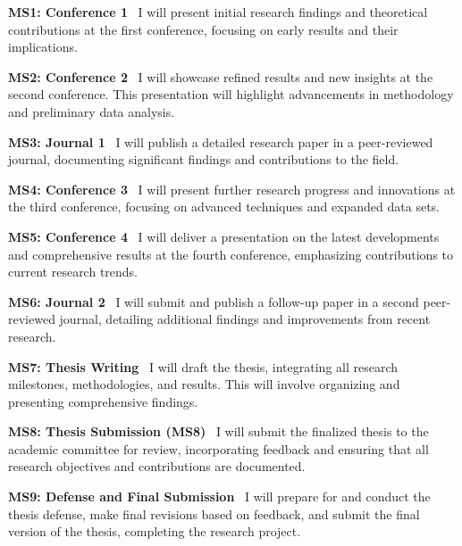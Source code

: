 \noindent \textbf{MS1: Conference 1} \
I will present initial research findings and theoretical contributions at the first conference, focusing on early results and their implications.

\noindent \textbf{MS2: Conference 2} \
I will showcase refined results and new insights at the second conference. This presentation will highlight advancements in methodology and preliminary data analysis.

\noindent \textbf{MS3: Journal 1} \
I will publish a detailed research paper in a peer-reviewed journal, documenting significant findings and contributions to the field.

\noindent \textbf{MS4: Conference 3} \
I will present further research progress and innovations at the third conference, focusing on advanced techniques and expanded data sets.

\noindent \textbf{MS5: Conference 4} \
I will deliver a presentation on the latest developments and comprehensive results at the fourth conference, emphasizing contributions to current research trends.

\noindent \textbf{MS6: Journal 2 } \
I will submit and publish a follow-up paper in a second peer-reviewed journal, detailing additional findings and improvements from recent research.

\noindent \textbf{MS7: Thesis Writing } \
I will draft the thesis, integrating all research milestones, methodologies, and results. This will involve organizing and presenting comprehensive findings.

\noindent \textbf{MS8: Thesis Submission (MS8)} \
I will submit the finalized thesis to the academic committee for review, incorporating feedback and ensuring that all research objectives and contributions are documented.

\noindent \textbf{MS9: Defense and Final Submission} \
I will prepare for and conduct the thesis defense, make final revisions based on feedback, and submit the final version of the thesis, completing the research project.

